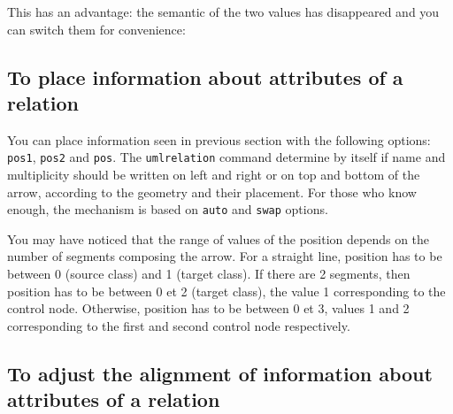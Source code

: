 \documentclass[a4paper,11pt]{report}
\begin{document}
\medskip

This has an advantage: the semantic of the two values has disappeared and you can switch them for convenience:

\medskip

\begin{minipage}{0.5\textwidth}

\end{minipage}
\begin{minipage}{0.4\textwidth}
\begin{center}
\end{center}
\end{minipage}

\medskip

\subsection{To place information about attributes of a relation}\label{ss.relposattr}

You can place information seen in previous section with the following options: {\tt pos1}, {\tt pos2} and {\tt pos}.
The {\tt umlrelation} command determine by itself if name and multiplicity should be written on left and right or on top and bottom of the arrow, according to the geometry and their placement. For those who know \TikZ enough, the mechanism is based on {\tt auto} and {\tt swap} options.

\medskip

\begin{minipage}{0.5\textwidth}

\end{minipage}
\begin{minipage}{0.4\textwidth}
\begin{center}
\end{center}
\end{minipage}

\medskip

You may have noticed that the range of values of the position depends on the number of segments composing the arrow. For a straight line, position has to be between  0 (source class) and 1 (target class). If there are 2 segments, then position has to be between 0 et 2 (target class), the value 1 corresponding to the control node. Otherwise, position has to be between 0 et 3, values 1 and 2 corresponding to the first and second control node respectively.

\subsection{To adjust the alignment of information about attributes of a relation}\label{ss.relalign}
\end{document}

